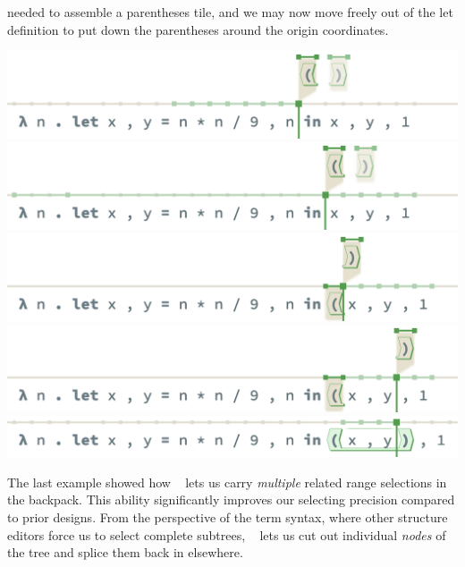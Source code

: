needed to assemble a parentheses tile, and we may
now move freely out of the let definition
to put down the parentheses around the origin coordinates.
\begin{center}
  \includegraphics[width=\columnwidth]{img/multi-restructure-5.png}
  \includegraphics[width=\columnwidth]{img/multi-restructure-6.png}
  \includegraphics[width=\columnwidth]{img/multi-restructure-7.png}
  \includegraphics[width=\columnwidth]{img/multi-restructure-8.png}
  \includegraphics[width=\columnwidth]{img/multi-restructure-9.png}
\end{center}

The last example showed how \tylr~ lets us carry \emph{multiple}
related range selections in the backpack.
This ability significantly improves our selecting precision
compared to prior designs.
From the perspective of the term syntax,
where other structure editors force us to select
complete subtrees, \tylr~ lets us cut out individual
\emph{nodes} of the tree and splice them back in
elsewhere.


